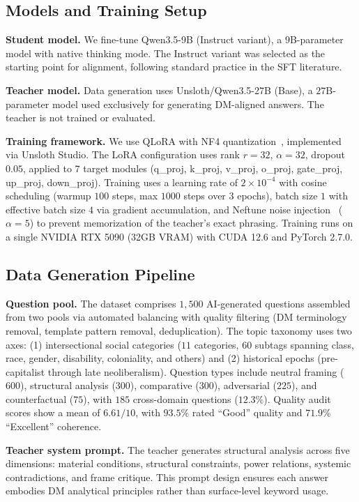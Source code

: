 \documentclass[11pt]{article}
\begin{document}
\subsection{Models and Training Setup}

\textbf{Student model.} We fine-tune Qwen3.5-9B (Instruct variant), a $9$B-parameter model with native thinking mode. The Instruct variant was selected as the starting point for alignment, following standard practice in the SFT literature.

\textbf{Teacher model.} Data generation uses Unsloth/Qwen3.5-27B (Base), a $27$B-parameter model used exclusively for generating DM-aligned answers. The teacher is not trained or evaluated.

\textbf{Training framework.} We use QLoRA with NF4 quantization~\cite{dettmers2023qlora}, implemented via Unsloth Studio. The LoRA configuration uses rank $r\!=\!32$, $\alpha\!=\!32$, dropout $0.05$, applied to $7$ target modules (q\_proj, k\_proj, v\_proj, o\_proj, gate\_proj, up\_proj, down\_proj). Training uses a learning rate of $2\!\times\!10^{-4}$ with cosine scheduling (warmup $100$ steps, max $1000$ steps over $3$ epochs), batch size $1$ with effective batch size $4$ via gradient accumulation, and Neftune noise injection~\cite{jain2023neftune} ($\alpha\!=\!5$) to prevent memorization of the teacher's exact phrasing. Training runs on a single NVIDIA RTX 5090 (32GB VRAM) with CUDA 12.6 and PyTorch 2.7.0.

\subsection{Data Generation Pipeline}

\textbf{Question pool.} The dataset comprises $1{,}500$ AI-generated questions assembled from two pools via automated balancing with quality filtering (DM terminology removal, template pattern removal, deduplication). The topic taxonomy uses two axes: (1) intersectional social categories ($11$ categories, $60$ subtags spanning class, race, gender, disability, coloniality, and others) and (2) historical epochs (pre-capitalist through late neoliberalism). Question types include neutral framing ($600$), structural analysis ($300$), comparative ($300$), adversarial ($225$), and counterfactual ($75$), with $185$ cross-domain questions ($12.3\%$). Quality audit scores show a mean of $6.61/10$, with $93.5\%$ rated ``Good'' quality and $71.9\%$ ``Excellent'' coherence.

\textbf{Teacher system prompt.} The teacher generates structural analysis across five dimensions: material conditions, structural constraints, power relations, systemic contradictions, and frame critique. This prompt design ensures each answer embodies DM analytical principles rather than surface-level keyword usage.
\end{document}
